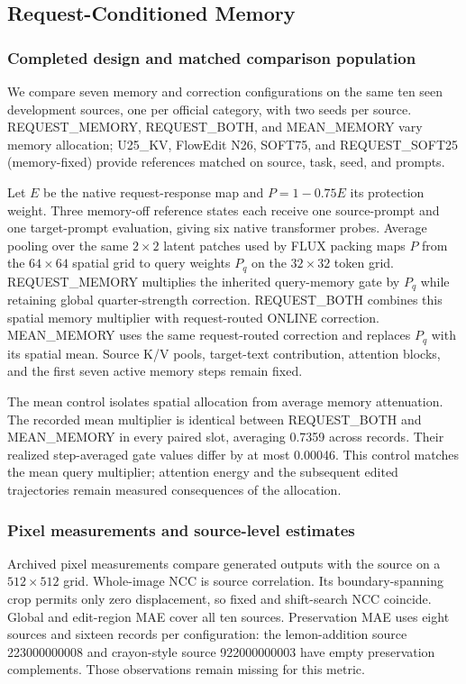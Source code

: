 \subsection{Request-Conditioned Memory}
\label{sec:r83-completed}
\subsubsection{Completed design and matched comparison population}
We compare seven memory and correction configurations on the same ten seen development sources, one per official category, with two seeds per source. REQUEST\_MEMORY, REQUEST\_BOTH, and MEAN\_MEMORY vary memory allocation; U25\_KV, FlowEdit N26, SOFT75, and REQUEST\_SOFT25 (memory-fixed) provide references matched on source, task, seed, and prompts.

Let $E$ be the native request-response map and $P=1-0.75E$ its protection weight. Three memory-off reference states each receive one source-prompt and one target-prompt evaluation, giving six native transformer probes. Average pooling over the same $2\times2$ latent patches used by FLUX packing maps $P$ from the $64\times64$ spatial grid to query weights $P_q$ on the $32\times32$ token grid. REQUEST\_MEMORY multiplies the inherited query-memory gate by $P_q$ while retaining global quarter-strength correction. REQUEST\_BOTH combines this spatial memory multiplier with request-routed ONLINE correction. MEAN\_MEMORY uses the same request-routed correction and replaces $P_q$ with its spatial mean. Source K/V pools, target-text contribution, attention blocks, and the first seven active memory steps remain fixed.

The mean control isolates spatial allocation from average memory attenuation. The recorded mean multiplier is identical between REQUEST\_BOTH and MEAN\_MEMORY in every paired slot, averaging 0.7359 across records. Their realized step-averaged gate values differ by at most 0.00046. This control matches the mean query multiplier; attention energy and the subsequent edited trajectories remain measured consequences of the allocation.

\subsubsection{Pixel measurements and source-level estimates}
Archived pixel measurements compare generated outputs with the source on a $512\times512$ grid. Whole-image NCC is source correlation. Its boundary-spanning crop permits only zero displacement, so fixed and shift-search NCC coincide. Global and edit-region MAE cover all ten sources. Preservation MAE uses eight sources and sixteen records per configuration: the lemon-addition source 223000000008 and crayon-style source 922000000003 have empty preservation complements. Those observations remain missing for this metric.

